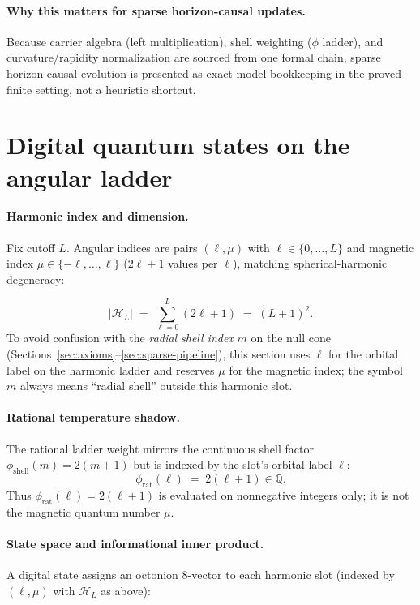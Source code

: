 \documentclass[11pt,a4paper]{article}
\theoremstyle{remark}
\begin{document}
\paragraph{Why this matters for sparse horizon-causal updates.}
Because carrier algebra (left multiplication), shell weighting ($\phi$ ladder), and curvature/rapidity normalization are sourced from one formal chain, sparse horizon-causal evolution is presented as exact model bookkeeping in the proved finite setting, not a heuristic shortcut.

\section{Digital quantum states on the angular ladder}

\paragraph{Harmonic index and dimension.}
Fix cutoff $L$. Angular indices are pairs $(\ell,\mu)$ with $\ell\in\{0,\ldots,L\}$ and magnetic index $\mu\in\{-\ell,\ldots,\ell\}$ ($2\ell+1$ values per $\ell$), matching spherical-harmonic degeneracy:

\begin{equation}
  |\mathcal{H}_L| \;=\; \sum_{\ell=0}^{L} (2\ell+1) \;=\; (L+1)^2.
\end{equation}
To avoid confusion with the \emph{radial shell index} $m$ on the null cone (Sections~\ref{sec:axioms}--\ref{sec:sparse-pipeline}), this section uses $\ell$ for the orbital label on the harmonic ladder and reserves $\mu$ for the magnetic index; the symbol $m$ always means ``radial shell'' outside this harmonic slot.

\paragraph{Rational temperature shadow.}
The rational ladder weight mirrors the continuous shell factor $\phi_{\mathrm{shell}}(m)=2(m+1)$ but is indexed by the slot's orbital label $\ell$:
\begin{equation}
  \phi_{\mathrm{rat}}(\ell) \;=\; 2(\ell+1)\in\mathbb{Q}.
\end{equation}
Thus $\phi_{\mathrm{rat}}(\ell)=2(\ell+1)$ is evaluated on nonnegative integers only; it is not the magnetic quantum number $\mu$.

\paragraph{State space and informational inner product.}
A digital state assigns an octonion $8$-vector to each harmonic slot (indexed by $(\ell,\mu)$ with $\mathcal{H}_L$ as above):
\end{document}
